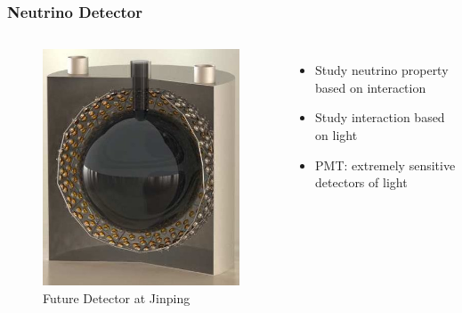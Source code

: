 \documentclass{beamer}
\begin{document}
\begin{frame}
\frametitle{Neutrino Detector}
\begin{columns}
\begin{figure}
    \centering
    \caption{Future Detector at Jinping}
    \includegraphics[width=1.0\linewidth]{img/DetectoratJinping.jpg}
\end{figure}
\begin{itemize}
    \item Study neutrino property based on interaction
    \item Study interaction based on light
    \item PMT: extremely sensitive detectors of light
\end{itemize}
\end{columns}
\end{frame}
\end{document}
